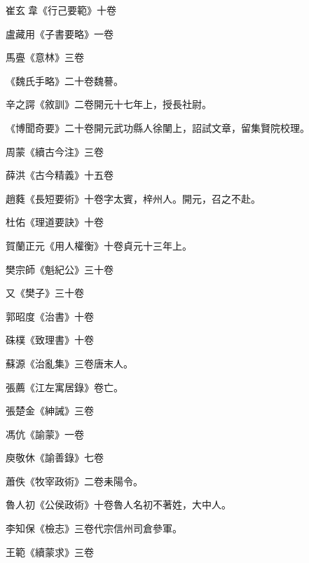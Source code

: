 \begin{pinyinscope}
 崔玄韋《行己要範》十卷



 盧藏用《子書要略》一卷



 馬亹《意林》三卷



 《魏氏手略》二十卷魏謩。



 辛之諤《敘訓》二卷開元十七年上，授長社尉。



 《博聞奇要》二十卷開元武功縣人徐闉上，詔試文章，留集賢院校理。



 周蒙《續古今注》三卷



 薛洪《古今精義》十五卷



 趙蕤《長短要術》十卷字太賓，梓州人。開元，召之不赴。



 杜佑《理道要訣》十卷



 賀蘭正元《用人權衡》十卷貞元十三年上。



 樊宗師《魁紀公》三十卷



 又《樊子》三十卷



 郭昭度《治書》十卷



 硃樸《致理書》十卷



 蘇源《治亂集》三卷唐末人。



 張薦《江左寓居錄》卷亡。



 張楚金《紳誡》三卷



 馮伉《諭蒙》一卷



 庾敬休《諭善錄》七卷



 蕭佚《牧宰政術》二卷耒陽令。



 魯人初《公侯政術》十卷魯人名初不著姓，大中人。



 李知保《檢志》三卷代宗信州司倉參軍。



 王範《續蒙求》三卷




\end{pinyinscope}
